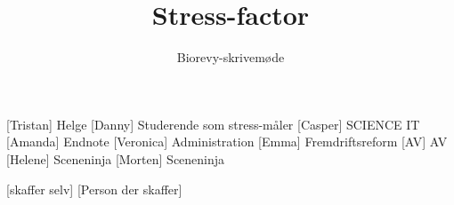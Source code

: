 \documentclass[a4paper,11pt]{article}
\title{Stress-factor}
\author{Biorevy-skrivemøde}
\begin{document}
\maketitle

\begin{roles}
	[Tristan] Helge
	[Danny] Studerende som stress-måler
	[Casper] SCIENCE IT
	[Amanda] Endnote
	[Veronica] Administration  
	[Emma] Fremdriftsreform
	[AV] AV
    [Helene] Sceneninja
    [Morten] Sceneninja
\end{roles}

\begin{props}
	[skaffer selv]
	[Person der skaffer]
\end{props}
\end{document}
